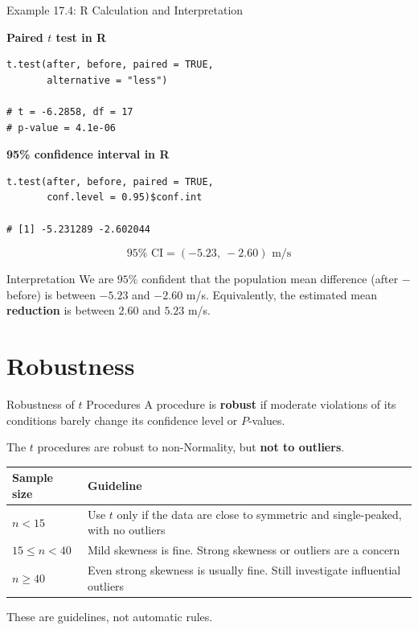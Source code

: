 \documentclass[aspectratio=169,10pt]{beamer}
\begin{document}
\begin{frame}[fragile]{Example 17.4: R Calculation and Interpretation}

\small
\textbf{Paired $t$ test in R}
\begin{lstlisting}[style=Rstyle]
t.test(after, before, paired = TRUE,
       alternative = "less")

# t = -6.2858, df = 17
# p-value = 4.1e-06
\end{lstlisting}

\vspace{0.1cm}
\textbf{95\% confidence interval in R}
\begin{lstlisting}[style=Rstyle]
t.test(after, before, paired = TRUE,
       conf.level = 0.95)$conf.int

# [1] -5.231289 -2.602044
\end{lstlisting}
$$\boxed{95\%\text{ CI}=(-5.23,\ -2.60)\text{ m/s}}$$
\begin{block}{Interpretation}
We are $95\%$ confident that the population mean difference (after $-$ before) is between $-5.23$ and $-2.60$ m/s. Equivalently, the estimated mean \textbf{reduction} is between $2.60$ and $5.23$ m/s.
\end{block}
\end{frame}


\section{Robustness}

\begin{frame}{Robustness of $t$ Procedures}
A procedure is \textbf{robust} if moderate violations of its conditions barely change its confidence level or $P$-values.

\vspace{0.2cm}
The $t$ procedures are robust to non-Normality, but \textbf{not to outliers}.

\vspace{0.2cm}
\begin{center}
\begin{tabularx}{0.90\textwidth}{>{\RaggedRight\arraybackslash}p{} X}
\toprule
\textbf{Sample size} & \textbf{Guideline} \\
\midrule
$n<15$ & Use $t$ only if the data are close to symmetric and single-peaked, with no outliers \\
$15\le n<40$ & Mild skewness is fine. Strong skewness or outliers are a concern \\
$n\ge40$ & Even strong skewness is usually fine. Still investigate influential outliers \\
\bottomrule
\end{tabularx}
\end{center}

These are guidelines, not automatic rules.
\end{frame}
\end{document}
